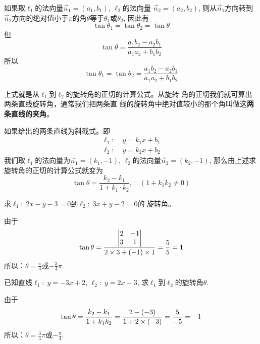 \begin{figure}[htp]
    \centering
\begin{tikzpicture}



\end{tikzpicture}
    \caption{}
\end{figure}

如果取$\ell_1$的法向量$\vec{n}_1=(a_1,b_1)$, $\ell_2$的法向量
$\vec{n}_2=(a_2,b_2)$, 
则从$\vec{n}_1$方向转到$\vec{n}_2$方向的绝对值小于$\pi$的角$\theta$等于$\theta_1$或$\theta_2$, 
因此有
\[\tan\theta_1=\tan\theta_2=\tan\theta\]
但
\[\tan\theta=\frac{a_1b_2-a_2b_1}{a_1a_2+b_1b_2}\]
所以
\[\tan\theta_1=\tan\theta_2=\frac{a_1b_2-a_2b_1}{a_1a_2+b_1b_2}\]

上式就是从$\ell_1$到$\ell_2$的旋转角的正切的计算公式。从旋转
角的正切我们就可算出两条直线旋转角，通常我们把两条直
线的旋转角中绝对值较小的那个角叫做这\textbf{两条直线的夹角}。

如果给出的两条直线为斜截式。即
\[\begin{split}
    \ell_1:&\; y=k_1x+b_1\\
    \ell_2:&\; y=k_2x+b_2
  \end{split}\]
我们取$\ell_1$的法向量为$\vec{n}_1=(k_1,-1)$, $\ell_2$的法向量$\vec{n}_2=(k_2,-1)$, 
那么由上述求旋转角的正切的计算公式就变为
\[\tan\theta=\frac{k_2-k_1}{1+k_1\cdot k_2},\quad (1+k_1k_2\ne 0)\]

\begin{example}
    求$\ell_1:\; 2x-y-3=0$到$\ell_2:\; 3x+y-2=0$的
旋转角。
\end{example}

\begin{solution}
由于
\[\tan\theta=\frac{\begin{vmatrix}
    2&-1\\3&1
\end{vmatrix}}{2\x 3+(-1)\x 1}=\frac{5}{5}=1\]
所以：$\theta=\frac{\pi}{4}$或$-\frac{3}{4}\pi$.
\end{solution}

\begin{example}
    已知直线$\ell_1:\; y=-3x+2$, $\ell_2:\; y=2x-3$, 
求$\ell_1$到$\ell_2$的旋转角$\theta$.
\end{example}

\begin{solution}
由于
\[\tan\theta=\frac{k_2-k_1}{1+k_1k_2}=\frac{2-(-3)}{1+2\x (-3)}=\frac{5}{-5}=-1\]
所以：$\theta=\frac{3}{4}\pi$或$-\frac{\pi}{4}$.
\end{solution}

